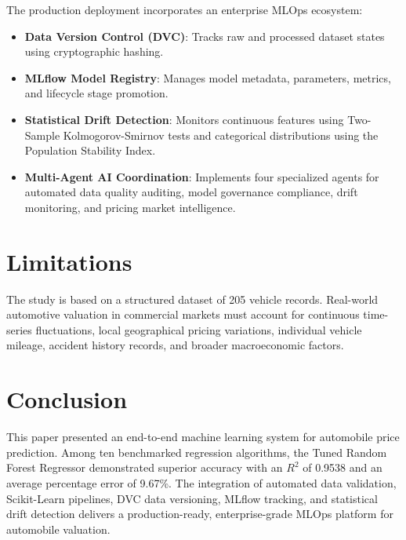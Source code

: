 \documentclass[conference]{IEEEtran}
\begin{document}
The production deployment incorporates an enterprise MLOps ecosystem:
\begin{itemize}
    \item \textbf{Data Version Control (DVC)}: Tracks raw and processed dataset states using cryptographic hashing.
    \item \textbf{MLflow Model Registry}: Manages model metadata, parameters, metrics, and lifecycle stage promotion.
    \item \textbf{Statistical Drift Detection}: Monitors continuous features using Two-Sample Kolmogorov-Smirnov tests and categorical distributions using the Population Stability Index.
    \item \textbf{Multi-Agent AI Coordination}: Implements four specialized agents for automated data quality auditing, model governance compliance, drift monitoring, and pricing market intelligence.
\end{itemize}

\section{Limitations}
The study is based on a structured dataset of 205 vehicle records. Real-world automotive valuation in commercial markets must account for continuous time-series fluctuations, local geographical pricing variations, individual vehicle mileage, accident history records, and broader macroeconomic factors.

\section{Conclusion}
This paper presented an end-to-end machine learning system for automobile price prediction. Among ten benchmarked regression algorithms, the Tuned Random Forest Regressor demonstrated superior accuracy with an $R^2$ of 0.9538 and an average percentage error of 9.67\%. The integration of automated data validation, Scikit-Learn pipelines, DVC data versioning, MLflow tracking, and statistical drift detection delivers a production-ready, enterprise-grade MLOps platform for automobile valuation.
\end{document}
